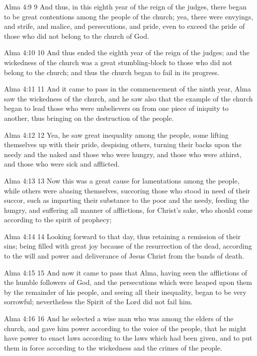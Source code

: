 Alma 4:9
 9 And thus, in this eighth year of the reign of the judges,
there began to be great contentions among the people of the
church; yea, there were envyings, and strife, and malice, and
persecutions, and pride, even to exceed the pride of those who
did not belong to the church of God.

Alma 4:10
 10 And thus ended the eighth year of the reign of the judges;
and the wickedness of the church was a great stumbling-block to
those who did not belong to the church; and thus the church began
to fail in its progress.

Alma 4:11
 11 And it came to pass in the commencement of the ninth year,
Alma saw the wickedness of the church, and he saw also that the
example of the church began to lead those who were unbelievers on
from one piece of iniquity to another, thus bringing on the
destruction of the people.

Alma 4:12
 12 Yea, he saw great inequality among the people, some lifting
themselves up with their pride, despising others, turning their
backs upon the needy and the naked and those who were hungry, and
those who were athirst, and those who were sick and afflicted.

Alma 4:13
 13 Now this was a great cause for lamentations among the people,
while others were abasing themselves, succoring those who stood
in need of their succor, such as imparting their substance to the
poor and the needy, feeding the hungry, and suffering all manner
of afflictions, for Christ's sake, who should come according to
the spirit of prophecy;

Alma 4:14
 14 Looking forward to that day, thus retaining a remission of
their sins; being filled with great joy because of the
resurrection of the dead, according to the will and power and
deliverance of Jesus Christ from the bands of death.

Alma 4:15
 15 And now it came to pass that Alma, having seen the
afflictions of the humble followers of God, and the persecutions
which were heaped upon them by the remainder of his people, and
seeing all their inequality, began to be very sorrowful;
nevertheless the Spirit of the Lord did not fail him.

Alma 4:16
 16 And he selected a wise man who was among the elders of the
church, and gave him power according to the voice of the people,
that he might have power to enact laws according to the laws
which had been given, and to put them in force according to the
wickedness and the crimes of the people.

